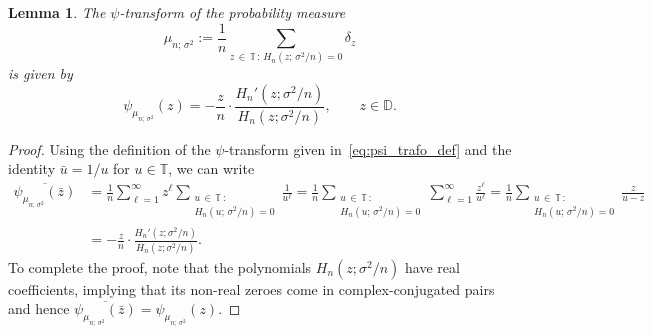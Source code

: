 \documentclass[10pt]{amsart}
\newtheorem{lemm}[theo]{Lemma}\newtheorem{prop}[theo]{Proposition}\newtheorem{coro}[theo]{Corollary}\newtheorem{conj}[theo]{Conjecture}
\theoremstyle{definition}\newtheorem{defi}[theo]{Definition}\newtheorem{rema}[theo]{Remark}\newtheorem{exam}[theo]{Example}\newtheorem{exem}[theo]{Example}\newtheorem{nota}[theo]{Notation}
\newcommand{\bT}{\mathbb{T}}
\newcommand{\bD}{\mathbb{D}}
\begin{document}
\begin{lemm}\label{lem:psi_mu_n_sigma^2}
The $\psi$-transform of the probability measure
\[
\mu_{n;\,\sigma^2}:=\frac 1n \sum_{z\,\in\,\bT\,:\, H_n\left(z;\,\sigma^2/n\right) = 0} \delta_z 
\]
is given by
\[
\psi_{\mu_{n;\,\sigma^2}}(z) = -\frac z n \cdot \frac{H_n'\left(z; \sigma^2/n\right)}{H_n\left(z;\sigma^2/n\right)},
\qquad z\in \bD.
\]
\end{lemm}
\begin{proof}
Using the definition of the $\psi$-transform given in~\eqref{eq:psi_trafo_def} and the identity $\bar u = 1/u$ for $u\in \bT$, we can write
\begin{align*}
\overline{\psi_{\mu_{n;\,\sigma^2}}(\bar z)} &=
\frac 1 n \sum_{\ell=1}^\infty z^\ell \sum_{\substack{u\,\in\,\bT\,:\\ H_n\left(u;\,\sigma^2/n\right) = 0}} \frac 1 {u^\ell} =
\frac 1 n \sum_{\substack{u\,\in\,\bT\,:\\ H_n\left(u;\,\sigma^2/n\right) = 0}} \sum_{\ell=1}^\infty \frac {z^\ell} {u^\ell} =
\frac 1 n \sum_{\substack{u\,\in\,\bT\,:\\ H_n\left(u;\,\sigma^2/n\right) = 0}} \frac{z}{u-z}
\\
&= -\frac z n \cdot \frac{H_n'\left(z; \sigma^2/n\right)}{H_n(z;\sigma^2/n)}.
\end{align*}
To complete the proof, note that the polynomials $H_n(z; \sigma^2/n)$ have real coefficients, implying that its non-real zeroes come in complex-conjugated pairs and hence $\overline{\psi_{\mu_{n;\,\sigma^2}}(\bar z)} = \psi_{\mu_{n;\,\sigma^2}}(z)$.
\end{proof}
\end{document}
